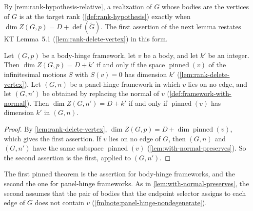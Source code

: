 By \cref{rem:rank-hypothesis-relative}, a realization of $G$ whose
bodies are the vertices of $G$ is at the target rank
(\cref{def:rank-hypothesis}) exactly when
$\dim Z(G,p) = D + \operatorname{def}(\tilde G)$. The first assertion of
the next lemma restates KT Lemma~5.1 (\cref{lem:rank-delete-vertex}) in
this form.

\begin{lemma}
  \label{lem:case-II-rank-lift}
  \leanok
  Let $(G,p)$ be a body-hinge framework, let $v$ be a body, and let
  $k'$ be an integer. Then $\dim Z(G,p) = D + k'$ if and only if the
  space $\operatorname{pinned}(v)$ of the infinitesimal motions $S$ with
  $S(v) = 0$ has dimension $k'$ (\cref{lem:rank-delete-vertex}). Let
  $(G,n)$ be a panel-hinge framework in which $v$ lies on no edge, and
  let $(G,n')$ be obtained by replacing the normal of $v$
  (\cref{def:framework-with-normal}). Then $\dim Z(G,n') = D + k'$ if
  and only if $\operatorname{pinned}(v)$ has dimension $k'$ in $(G,n)$.
\end{lemma}
\begin{proof}
  \leanok
  By \cref{lem:rank-delete-vertex},
  $\dim Z(G,p) = D + \dim \operatorname{pinned}(v)$, which gives the
  first assertion. If $v$ lies on no edge of $G$, then $(G,n)$ and
  $(G,n')$ have the same subspace $\operatorname{pinned}(v)$
  (\cref{lem:with-normal-preserves}). So the second assertion is the
  first, applied to $(G,n')$.
\end{proof}

\begin{fmlnote}
  The first pinned theorem is the assertion for body-hinge frameworks,
  and the second the one for panel-hinge frameworks. As in
  \cref{lem:with-normal-preserves}, the second assumes that the pair of
  bodies that the endpoint selector assigns to each edge of $G$ does
  not contain $v$ (\cref{fmlnote:panel-hinge-nondegenerate}).
\end{fmlnote}

